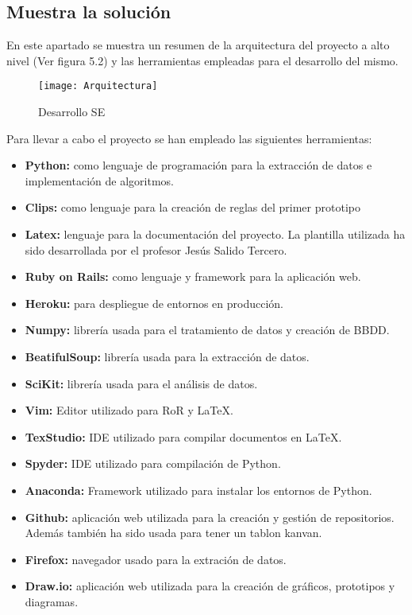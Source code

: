 \subsection{Muestra la solución}
En este apartado se muestra un resumen de la arquitectura del proyecto a alto nivel
(Ver figura 5.2) y las herramientas empleadas para el desarrollo del mismo.

\begin{figure}[htb]
  \centering
    \texttt{[image: Arquitectura]}
  \caption[Desarrollo SE]{Desarrollo SE}
  \label{fig:Desarrollo Sistema Experto}
\end{figure}


Para llevar a cabo el proyecto se han empleado las siguientes herramientas:
\begin{itemize}
  \item \textbf{Python:} como lenguaje de programación para la extracción de datos e implementación
    de algoritmos.
  \item \textbf{Clips:} como lenguaje para la creación de reglas del primer prototipo
  \item \textbf{Latex:} lenguaje para la documentación del proyecto. La plantilla utilizada
    ha sido desarrollada por el profesor Jesús Salido Tercero.
  \item \textbf{Ruby on Rails:} como lenguaje y framework para la aplicación web.
  \item \textbf{Heroku:} para despliegue de entornos en producción.
  \item \textbf{Numpy:} librería usada para el tratamiento de datos y creación de BBDD.
  \item \textbf{BeatifulSoup:} librería usada para la extracción de datos.
  \item \textbf{SciKit:} librería usada para el análisis de datos.
  \item \textbf{Vim:} Editor utilizado para RoR y LaTeX.
  \item \textbf{TexStudio:} IDE utilizado para compilar documentos en LaTeX.
  \item \textbf{Spyder:} IDE utilizado para compilación de Python.
  \item \textbf{Anaconda:} Framework utilizado para instalar los entornos de Python.
  \item \textbf{Github:} aplicación web utilizada para la creación y gestión de repositorios.
    Además también ha sido usada para tener un tablon kanvan.
  \item \textbf{Firefox:} navegador usado para la extración de datos.
  \item \textbf{Draw.io:} aplicación web utilizada para la creación de gráficos, prototipos
    y diagramas.
\end{itemize}

